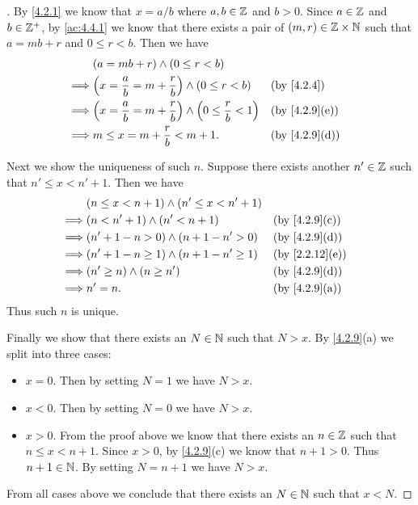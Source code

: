 \begin{proof}[]
  By \cref{4.2.1} we know that \(x = a / b\) where \(a, b \in \mathbb{Z}\) and \(b > 0\).
  Since \(a \in \mathbb{Z}\) and \(b \in \mathbb{Z}^+\), by \cref{ac:4.4.1} we know that there exists a pair of \((m, r) \in \mathbb{Z} \times \mathbb{N}\) such that \(a = mb + r\) and \(0 \leq r < b\).
  Then we have
  \begin{align*}
             & (a = mb + r) \land (0 \leq r < b)                                                              \\
    \implies & \pa{x = \dfrac{a}{b} = m + \dfrac{r}{b}} \land (0 \leq r < b)               &  & \by{4.2.4}    \\
    \implies & \pa{x = \dfrac{a}{b} = m + \dfrac{r}{b}} \land \pa{0 \leq \dfrac{r}{b} < 1} &  & \by{4.2.9}[e] \\
    \implies & m \leq x = m + \dfrac{r}{b} < m + 1.                                        &  & \by{4.2.9}[d]
  \end{align*}

  Next we show the uniqueness of such \(n\).
  Suppose there exists another \(n' \in \mathbb{Z}\) such that \(n' \leq x < n' + 1\).
  Then we have
  \begin{align*}
             & (n \leq x < n + 1) \land (n' \leq x < n' + 1)                     \\
    \implies & (n < n' + 1) \land (n' < n + 1)               &  & \by{4.2.9}[c]  \\
    \implies & (n' + 1 - n > 0) \land (n + 1 - n' > 0)       &  & \by{4.2.9}[d]  \\
    \implies & (n' + 1 - n \geq 1) \land (n + 1 - n' \geq 1) &  & \by{2.2.12}[e] \\
    \implies & (n' \geq n) \land (n \geq n')                 &  & \by{4.2.9}[d]  \\
    \implies & n' = n.                                       &  & \by{4.2.9}[a]
  \end{align*}
  Thus such \(n\) is unique.

  Finally we show that there exists an \(N \in \mathbb{N}\) such that \(N > x\).
  By \cref{4.2.9}(a) we split into three cases:
  \begin{itemize}
    \item \(x = 0\).
          Then by setting \(N = 1\) we have \(N > x\).
    \item \(x < 0\).
          Then by setting \(N = 0\) we have \(N > x\).
    \item \(x > 0\).
          From the proof above we know that there exists an \(n \in \mathbb{Z}\) such that \(n \leq x < n + 1\).
          Since \(x > 0\), by \cref{4.2.9}(c) we know that \(n + 1 > 0\).
          Thus \(n + 1 \in \mathbb{N}\).
          By setting \(N = n + 1\) we have \(N > x\).
  \end{itemize}
  From all cases above we conclude that there exists an \(N \in \mathbb{N}\) such that \(x < N\).
\end{proof}

